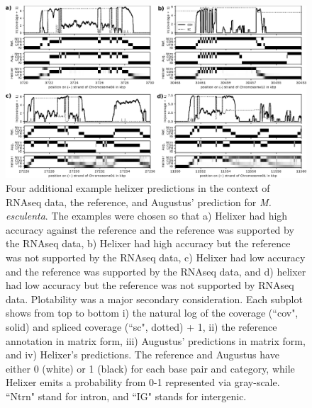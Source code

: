 \documentclass{article}
\begin{document}
\begin{figure}[!h]
\renewcommand\thefigure{S8}
\centerline{\includegraphics[width=17.8cm]{images/cov_examples/cov_example_003}}
\caption{
Four additional example helixer predictions in the context of RNAseq data, the reference,
and Augustus' prediction for {\it M. esculenta}. The examples were chosen so
that a) Helixer had high accuracy against the reference and the reference
was supported by the RNAseq data, b) Helixer had high accuracy but the
reference was not supported by the RNAseq data, c) Helixer had low accuracy
and the reference was supported by the RNAseq data, and d) helixer had low
accuracy but the reference was not supported by RNAseq data. Plotability was
a major secondary consideration. Each subplot shows from top to
bottom i) the natural log of the coverage (``cov", solid) and spliced coverage
(``sc", dotted) + 1, ii) the reference annotation in matrix form, iii)
Augustus' predictions in matrix form, and iv) Helixer's predictions. The reference
and Augustus have either 0 (white) or 1 (black) for each base pair and category, while
Helixer emits a probability from 0-1 represented via gray-scale. ``Ntrn" stand
for intron, and ``IG" stands for intergenic.
}
\end{figure}
\end{document}
